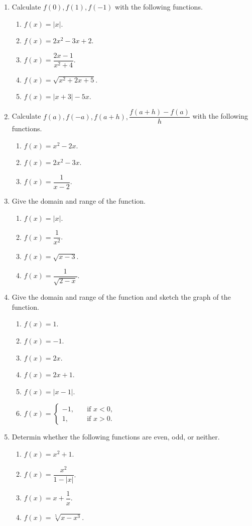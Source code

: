 \documentclass[11pt]{book}
\theoremstyle{break}
\theoremstyle{no_label}
\numberwithin{equation}{section}
\begin{document}
\begin{enumerate}[label=\arabic*.]
    \item Calculate $f(0), f(1), f(-1)$ with the following functions.
    \begin{enumerate}
        \item $f(x)=|x|$.
        \item $f(x)=2x^2-3x+2$.
        \item $f(x)=\dfrac{2x-1}{x^2+4}$.
        \item $f(x)=\sqrt{x^2+2x+5}$.
        \item $f(x)=|x+3|-5x$.
    \end{enumerate}
    \item Calculate $f(a), f(-a), f(a+h), \dfrac{f(a+h)-f(a)}{h}$ with the following functions.
    \begin{enumerate}
        \item $f(x)=x^2-2x$.
        \item $f(x)=2x^2-3x$.
        \item $f(x)=\dfrac{1}{x-2}$.
    \end{enumerate}
    \item Give the domain and range of the function.
    \begin{enumerate}
        \item $f(x)=|x|$.
        \item $f(x)=\dfrac{1}{x^2}$.
        \item $f(x)=\sqrt{x-3}$.
        \item $f(x)=\dfrac{1}{\sqrt{2-x}}$.
    \end{enumerate}
    \item Give the domain and range of the function and sketch the graph of the function.
    \begin{enumerate}
        \item $f(x)=1$.
        \item $f(x)=-1$.
        \item $f(x)=2x$.
        \item $f(x)=2x+1$.
        \item $f(x)=|x-1|$.
        \item $f(x)=\left\{\begin{array}{rl}
            -1,\quad&\text{if $x<0$,}\\1,\quad&\text{if $x>0$}.
        \end{array}\right.$
    \end{enumerate}
    \item Determin whether the following functions are even, odd, or neither.
    \begin{enumerate}
        \item $f(x)=x^2+1$.
        \item $f(x)=\dfrac{x^2}{1-|x|}$.
        \item $f(x)=x+\dfrac{1}{x}$.
        \item $f(x)=\sqrt[5]{x-x^3}$.
    \end{enumerate}
\end{enumerate}
\end{document}
